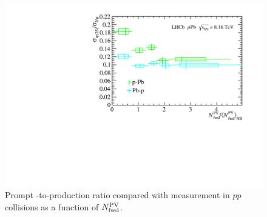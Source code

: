 \begin{figure}[H]
    \begin{center}
            \includegraphics[width=0.7\linewidth]{pdf/pPb/FWorkdir/Result/Norm.pdf}
    \end{center}
    \caption{Prompt \psitwos-to-\jpsi production ratio compared with measurement in $pp$ collisions as a function of $N^{\rm PV}_{\rm fwd}$.
      }
    \label{RForpp}
\end{figure}
